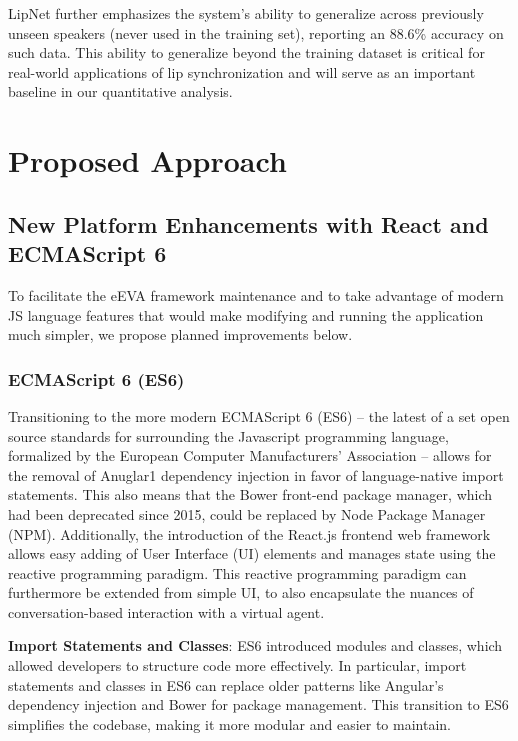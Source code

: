 \documentclass[12pt]{article}
\begin{document}
LipNet\cite{AssaelLIPNET:LIPREADING} further emphasizes the system's ability to generalize across previously unseen speakers (never used in the training set), reporting an 88.6\% accuracy on such data. This ability to generalize beyond the training dataset is critical for real-world applications of lip synchronization and will serve as an important baseline in our quantitative analysis.


\section{Proposed Approach}
\label{sec:approach}

\subsection{New Platform Enhancements with React and ECMAScript 6}

To facilitate the eEVA framework maintenance  and to take advantage of modern JS language features that would make modifying and running the application much simpler, we propose planned improvements below. 

\subsubsection{ECMAScript 6 (ES6)}

Transitioning to the more modern ECMAScript 6 (ES6) -- the latest of a set open source standards for surrounding the Javascript programming language, formalized by the European Computer Manufacturers' Association\cite{ECMA-262International} -- allows for the removal of Anuglar1 dependency injection in favor of language-native import statements\cite{ECMA-262International}\cite{JavaScriptMDN}\cite{ExploringES6}. This also means that the Bower front-end package manager, which had been deprecated since 2015, could be replaced by Node Package Manager (NPM). Additionally, the introduction of the React.js frontend web framework allows easy adding of User Interface (UI) elements and manages state using the reactive programming paradigm. This reactive programming paradigm can  furthermore be extended from simple UI, to also encapsulate the nuances of conversation-based interaction with a virtual agent.

\textbf{Import Statements and Classes}: ES6 introduced modules and classes, which allowed developers to structure code more effectively. In particular, import statements and classes in ES6 can replace older patterns like Angular’s dependency injection and Bower for package management. This transition to ES6 simplifies the codebase, making it more modular and easier to maintain.
\end{document}
